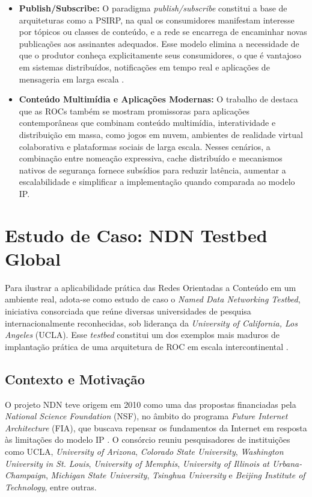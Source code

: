 \documentclass[12pt]{article}
\begin{document}
\begin{itemize}

\item \textbf{Publish/Subscribe:}
O paradigma \textit{publish/subscribe} constitui a base de arquiteturas como a PSIRP, na qual os consumidores manifestam interesse por tópicos ou classes de conteúdo, e a rede se encarrega de encaminhar novas publicações aos assinantes adequados. Esse modelo elimina a necessidade de que o produtor conheça explicitamente seus consumidores, o que é vantajoso em sistemas distribuídos, notificações em tempo real e aplicações de mensageria em larga escala \cite{bvm12}.

\item \textbf{Conteúdo Multimídia e Aplicações Modernas:}
O trabalho de \cite{bvm12} destaca que as ROCs também se mostram promissoras para aplicações contemporâneas que combinam conteúdo multimídia, interatividade e distribuição em massa, como jogos em nuvem, ambientes de realidade virtual colaborativa e plataformas sociais de larga escala. Nesses cenários, a combinação entre nomeação expressiva, cache distribuído e mecanismos nativos de segurança fornece subsídios para reduzir latência, aumentar a escalabilidade e simplificar a implementação quando comparada ao modelo IP.

\end{itemize}

\section{Estudo de Caso: NDN Testbed Global}

Para ilustrar a aplicabilidade prática das Redes Orientadas a Conteúdo em um ambiente real, adota-se como estudo de caso o \textit{Named Data Networking Testbed}, iniciativa consorciada que reúne diversas universidades de pesquisa internacionalmente reconhecidas, sob liderança da \textit{University of California, Los Angeles} (UCLA). Esse \textit{testbed} constitui um dos exemplos mais maduros de implantação prática de uma arquitetura de ROC em escala intercontinental \cite{afanasyev2018brief}.

\subsection{Contexto e Motivação}

O projeto NDN teve origem em 2010 como uma das propostas financiadas pela \textit{National Science Foundation} (NSF), no âmbito do programa \textit{Future Internet Architecture} (FIA), que buscava repensar os fundamentos da Internet em resposta às limitações do modelo IP \cite{zhang2014ndn}. O consórcio reuniu pesquisadores de instituições como UCLA, \textit{University of Arizona}, \textit{Colorado State University}, \textit{Washington University in St. Louis}, \textit{University of Memphis}, \textit{University of Illinois at Urbana-Champaign}, \textit{Michigan State University}, \textit{Tsinghua University} e \textit{Beijing Institute of Technology}, entre outras.
\end{document}

